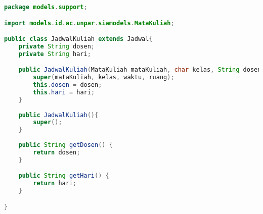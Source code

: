 \singlespacing 
\begin{lstlisting}[language=Java,basicstyle=\tiny,caption=JadwalKuliah.java]
	package models.support;

import models.id.ac.unpar.siamodels.MataKuliah;

public class JadwalKuliah extends Jadwal{
    private String dosen;
    private String hari;

    public JadwalKuliah(MataKuliah mataKuliah, char kelas, String dosen, String hari, String waktu, String ruang) {
        super(mataKuliah, kelas, waktu, ruang);
        this.dosen = dosen;
        this.hari = hari;
    }
    
    public JadwalKuliah(){
        super();
    }
        
    public String getDosen() {
        return dosen;
    }

    public String getHari() {
        return hari;
    }

}
\end{lstlisting}

